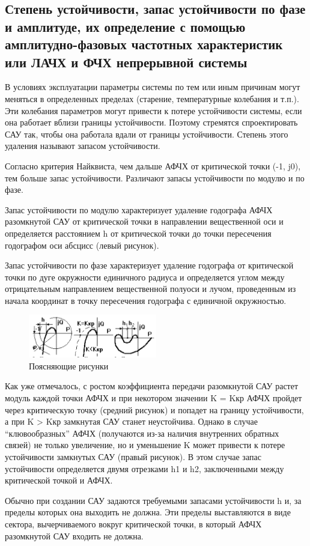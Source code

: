 \subsection{Степень устойчивости, запас устойчивости по 	фазе и амплитуде, их определение с помощью амплитудно-фазовых частотных характеристик или ЛАЧХ и ФЧХ непрерывной 	системы}

В условиях эксплуатации параметры системы по тем или иным причинам могут меняться в определенных пределах (старение, температурные колебания и т.п.). Эти колебания параметров могут привести к потере устойчивости системы, если она работает вблизи границы устойчивости. Поэтому стремятся спроектировать САУ так, чтобы она работала вдали от границы устойчивости. Степень этого удаления называют запасом устойчивости.

Согласно критерия Найквиста, чем дальше АФЧХ от критической точки (-1, j0), тем больше запас устойчивости. Различают запасы устойчивости по модулю и по фазе.

Запас устойчивости по модулю характеризует удаление годографа АФЧХ разомкнутой САУ от критической точки в направлении вещественной оси и определяется расстоянием h от критической точки до точки пересечения годографом оси абсцисс (левый рисунок).

Запас устойчивости по фазе характеризует удаление годографа от критической точки по дуге окружности единичного радиуса и определяется углом  между отрицательным направлением вещественной полуоси и лучом, проведенным из начала координат в точку пересечения годографа с единичной окружностью.

\begin{figure}[!h]
    \centering
    \includegraphics[width=0.5\textwidth]{images/stab.png}
    \caption{Поясняющие рисунки}
    \label{fig:stubs}
\end{figure}

Как уже отмечалось, с ростом коэффициента передачи разомкнутой САУ растет модуль каждой точки АФЧХ и при некотором значении K = Kкр АФЧХ пройдет через критическую точку (средний рисунок) и попадет на границу устойчивости, а при K > Kкр замкнутая САУ станет неустойчива. Однако в случае “клювообразных” АФЧХ (получаются из-за наличия внутренних обратных связей) не только увеличение, но и уменьшение K может привести к потере устойчивости замкнутых САУ (правый рисунок). В этом случае запас устойчивости определяется двумя отрезками h1 и h2, заключенными между критической точкой и АФЧХ.

Обычно при создании САУ задаются требуемыми запасами устойчивости h и, за пределы которых она выходить не должна. Эти пределы выставляются в виде сектора, вычерчиваемого вокруг критической точки, в который АФЧХ разомкнутой САУ входить не должна.


